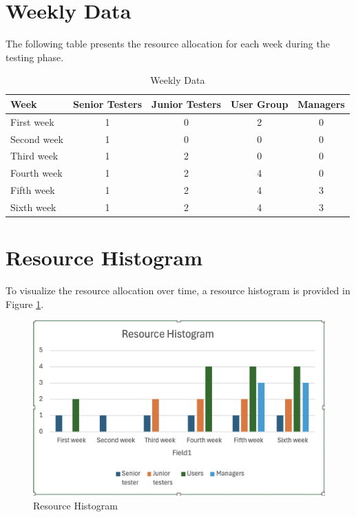 \section{Weekly Data}

The following table presents the resource allocation for each week during the testing phase.

\begin{table}[h]
    \centering
    \caption{Weekly Data}
    \label{tab:weekly_data}
    \begin{tabular}{|l|c|c|c|c|}
    \hline
    \rowcolor{lightgray} \textbf{Week} & \textbf{Senior Testers} & \textbf{Junior Testers} & \textbf{User Group} & \textbf{Managers} \\
    \hline
    First week  & 1 & 0 & 2 & 0 \\
    \hline
    Second week & 1 & 0 & 0 & 0 \\
    \hline
    Third week  & 1 & 2 & 0 & 0 \\
    \hline
    Fourth week & 1 & 2 & 4 & 0 \\
    \hline
    Fifth week  & 1 & 2 & 4 & 3 \\
    \hline
    Sixth week  & 1 & 2 & 4 & 3 \\
    \hline
    \end{tabular}
\end{table}

\section{Resource Histogram}

To visualize the resource allocation over time, a resource histogram is provided in Figure \ref{fig:rhst}.

\begin{figure}[ht]
    \centering
    \includegraphics[width=\textwidth]{images/Resource Histogram.png}
    \caption{Resource Histogram}
    \label{fig:rhst}
\end{figure}

\FloatBarrier
\newpage